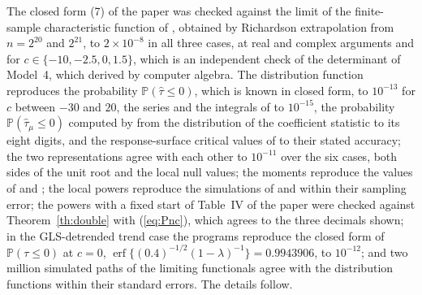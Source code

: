 \documentclass[ecta,nameyear,final,supplement]{econsocart}
\newcommand{\PP}{{\mathbb P}}
\newcommand{\erf}{\operatorname{erf}}
\theoremstyle{plain}
\theoremstyle{definition}
\begin{document}
The closed form (7) of the paper was checked against the limit of the finite-sample characteristic function of \cite{BaoBrodaKan2026}, obtained by Richardson extrapolation from $n=2^{20}$ and $2^{21}$, to $2\times10^{-8}$ in all three cases, at real and complex arguments and for $c\in\{-10,-2.5,0,1.5\}$, which is an independent check of the determinant of Model~4, which \cite{NabeyaTanaka1990} derived by computer algebra.  The distribution function reproduces the probability $\PP(\hat\tau\le0)$, which is known in closed form, to $10^{-13}$ for $c$ between $-30$ and $20$, the series and the integrals of \cite{Abadir1995} to $10^{-15}$, the probability $\PP(\hat\tau_\mu\le0)$ computed by \cite{BaoKan2026} from the distribution of the coefficient statistic to its eight digits, and the response-surface critical values of \cite{MacKinnon1996,MacKinnon2010} to their stated accuracy; the two representations agree with each other to $10^{-11}$ over the six cases, both sides of the unit root and the local null values; the moments reproduce the values of \cite{Nabeya1999} and \cite{Larsson1997}; the local powers reproduce the simulations of \cite{Larsson1995} and \cite{Elliott1999} within their sampling error; the powers with a fixed start of Table~IV of the paper were checked against Theorem~\ref{th:double} with (\ref{eq:Pnc}), which agrees to the three decimals shown; in the GLS-detrended trend case the programs reproduce the closed form of $\PP(\tau\le0)$ at $c=0$, $\erf\{(0.4)^{-1/2}(1-\lambda)^{-1}\}=0.9943906$, to $10^{-12}$; and two million simulated paths of the limiting functionals agree with the distribution functions within their standard errors.  The details follow.
\end{document}
